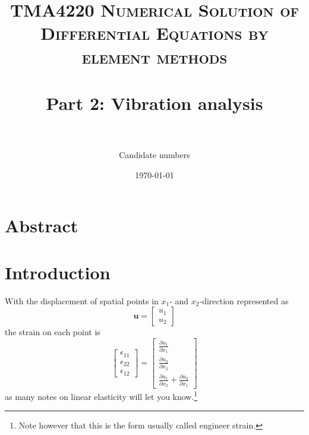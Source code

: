 \documentclass[paper=a4, fontsize=11pt]{scrartcl} %
\title{	
\normalfont \normalsize 
\textsc{TMA4220 Numerical Solution of Differential Equations by element methods} \\ [25pt] %
\horrule{0.5pt} \\[0.4cm] %
\huge Part 2: Vibration analysis \\ %
\horrule{2pt} \\[0.5cm] %
}
\author{Candidate numbers} %
\date{\normalsize\today} %
\begin{document}
\maketitle

\section*{Abstract}

\section*{Introduction}
With the displacement of spatial points in $x_1$- and $x_2$-direction represented as
\begin{equation*}
\boldsymbol{u} = \begin{bmatrix}
u_1 \\ u_2
\end{bmatrix}
\end{equation*}
the strain on each point is
\begin{equation*}
\begin{bmatrix}
\epsilon_{11} \\
\epsilon_{22} \\
\epsilon_{12}
\end{bmatrix}
=
\begin{bmatrix}
\frac{\partial u_1}{\partial x_1} \\
\frac{\partial u_2}{\partial x_2} \\
\frac{\partial u_1}{\partial x_2}+\frac{\partial u_2}{\partial x_1}
\end{bmatrix}
\end{equation*}
as many notes on linear elasticity will let you know.\footnote{Note however that this is the form usually called engineer strain.} 
\end{document}
